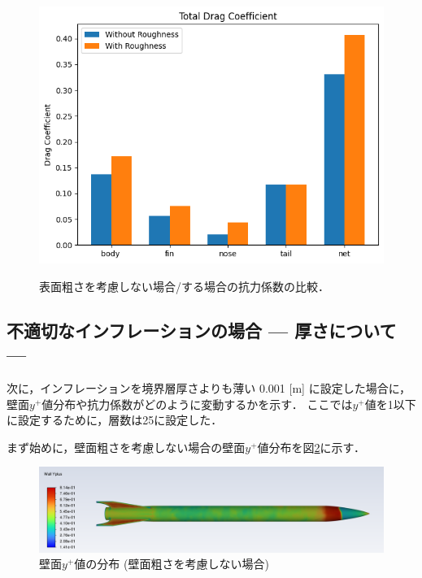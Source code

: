\documentclass[uplatex,dvipdfmx,a4j,12pt]{jsarticle}
\begin{document}
\begin{figure}[H]
\begin{minipage}{0.45\linewidth}
      \label{fig:4_1_cd_viscous}
  \end{minipage}
  \begin{minipage}{0.45\linewidth}
      \centering
      \includegraphics[width=\linewidth]{wall_function/img/4_1_total_drag.png}
      \label{fig:4_1_cd_total}
  \end{minipage}
  \caption{表面粗さを考慮しない場合/する場合の抗力係数の比較．}
  \label{fig:4_1_cd}
\end{figure}


\subsection{不適切なインフレーションの場合 --- 厚さについて ---}
次に，インフレーションを境界層厚さよりも薄い 0.001 [m] に設定した場合に，壁面$y^+$値分布や抗力係数がどのように変動するかを示す．
ここでは$y^+$値を1以下に設定するために，層数は25に設定した．

まず始めに，壁面粗さを考慮しない場合の壁面$y^+$値分布を図\ref{fig:yplus_no_rough_2}に示す．
\begin{figure}[H]
  \centering
  \includegraphics[width=\linewidth]{wall_function/img/4_2_yplus.png}
  \caption{壁面$y^+$値の分布 (壁面粗さを考慮しない場合)}
  \label{fig:yplus_no_rough_2}
\end{figure}
\end{document}
